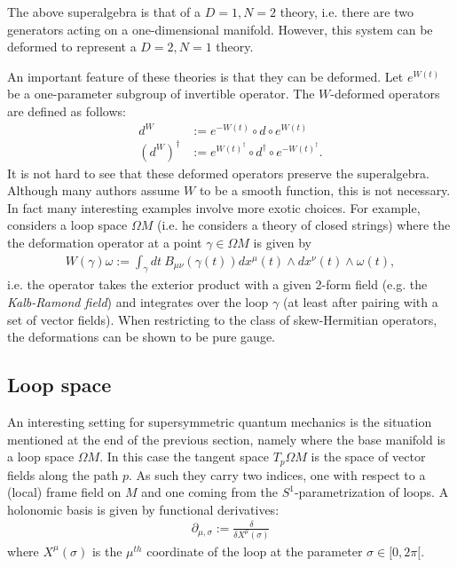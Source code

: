     The above superalgebra is that of a $D=1,N=2$ theory, i.e. there are two generators acting on a one-dimensional manifold. However, this system can be deformed to represent a $D=2,N=1$ theory.

    An important feature of these theories is that they can be deformed. Let $e^{W(t)}$ be a one-parameter subgroup of invertible operator. The $W$-deformed operators are defined as follows:
    \begin{align}
        d^W &:= e^{-W(t)}\circ d\circ e^{W(t)}\\
        (d^W)^\dagger &:= e^{W(t)^\dagger}\circ d^\dagger\circ e^{-W(t)^\dagger}.
    \end{align}
    It is not hard to see that these deformed operators preserve the superalgebra. Although many authors assume $W$ to be a smooth function, this is not necessary. In fact many interesting examples involve more exotic choices. For example, \cite{phd_schreiber} considers a loop space $\Omega M$ (i.e. he considers a theory of closed strings) where the the deformation operator at a point $\gamma\in\Omega M$ is given by
    \begin{gather}
        W(\gamma)\omega := \int_\gamma dt\ B_{\mu\nu}(\gamma(t))dx^\mu(t)\wedge dx^\nu(t)\wedge\omega(t),
    \end{gather}
    i.e. the operator takes the exterior product with a given 2-form field (e.g. the \textit{Kalb-Ramond field}) and integrates over the loop $\gamma$ (at least after pairing with a set of vector fields). When restricting to the class of skew-Hermitian operators, the deformations can be shown to be pure gauge.

\subsection{Loop space}

    An interesting setting for supersymmetric quantum mechanics is the situation mentioned at the end of the previous section, namely where the base manifold is a loop space $\Omega M$. In this case the tangent space $T_p\Omega M$ is the space of vector fields along the path $p$. As such they carry two indices, one with respect to a (local) frame field on $M$ and one coming from the $S^1$-parametrization of loops. A holonomic basis is given by functional derivatives:
    \begin{gather}
        \partial_{\mu,\sigma} := \frac{\delta}{\delta X^\mu(\sigma)}
    \end{gather}
    where $X^\mu(\sigma)$ is the $\mu^{th}$ coordinate of the loop at the parameter $\sigma\in[0,2\pi[$.



